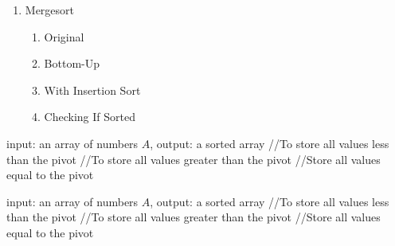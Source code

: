 \documentclass{IEEEtran}
\begin{document}
\begin{enumerate}
\item Mergesort
\begin{enumerate}
\item Original
\item Bottom-Up
\item With Insertion Sort
\item Checking If Sorted
\end{enumerate}

\end{enumerate}


\begin{algorithm}[h!]
    \begin{algorithmic}[1]
         {input:  an array of numbers $A$, output: a sorted array}
              //To store all values less than the pivot
              //To store all values greater than the pivot
                //Store all values equal to the pivot
                \EndIf
            \EndFor{}  
            \State{} 
 
        \EndFunction{}
    \end{algorithmic}
\end{algorithm}


\begin{algorithm}[h!]
    \begin{algorithmic}[1]
         {input:  an array of numbers $A$, output: a sorted array}
              //To store all values less than the pivot
              //To store all values greater than the pivot
                //Store all values equal to the pivot
                \EndIf
            \EndFor{}  
            \State{} 
 
        \EndFunction{}
    \end{algorithmic}
\end{algorithm}
\end{document}
